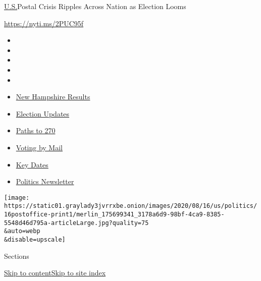 \href{/section/us}{U.S.}\textbar{}Postal Crisis Ripples Across Nation as
Election Looms

\url{https://nyti.ms/2PUC95f}

\begin{itemize}
\item
\item
\item
\item
\item
\end{itemize}

\begin{itemize}
\item
  \href{https://www.nytimes3xbfgragh.onion/interactive/2020/09/08/us/elections/results-new-hampshire-primary-elections.html?action=click\&pgtype=Article\&state=default\&region=TOP_BANNER\&context=storylines_menu}{New
  Hampshire Results}
\item
  \href{https://www.nytimes3xbfgragh.onion/live/2020/09/09/us/trump-vs-biden?action=click\&pgtype=Article\&state=default\&region=TOP_BANNER\&context=storylines_menu}{Election
  Updates}
\item
  \href{https://www.nytimes3xbfgragh.onion/interactive/2020/us/elections/election-states-biden-trump.html?action=click\&pgtype=Article\&state=default\&region=TOP_BANNER\&context=storylines_menu}{Paths
  to 270}
\item
  \href{https://www.nytimes3xbfgragh.onion/interactive/2020/08/31/us/politics/vote-by-mail-deadlines.html?action=click\&pgtype=Article\&state=default\&region=TOP_BANNER\&context=storylines_menu}{Voting
  by Mail}
\item
  \href{https://www.nytimes3xbfgragh.onion/interactive/2019/us/elections/2020-presidential-election-calendar.html?action=click\&pgtype=Article\&state=default\&region=TOP_BANNER\&context=storylines_menu}{Key
  Dates}
\item
  \href{https://www.nytimes3xbfgragh.onion/newsletters/politics?action=click\&pgtype=Article\&state=default\&region=TOP_BANNER\&context=storylines_menu}{Politics
  Newsletter}
\end{itemize}

\texttt{[image: https://static01.graylady3jvrrxbe.onion/images/2020/08/16/us/politics/16postoffice-print1/merlin\_175699341\_3178a6d9-98bf-4ca9-8385-5548d46d795a-articleLarge.jpg?quality=75\\\&auto=webp\\\&disable=upscale]}

Sections

\protect\hyperlink{site-content}{Skip to
content}\protect\hyperlink{site-index}{Skip to site index}

